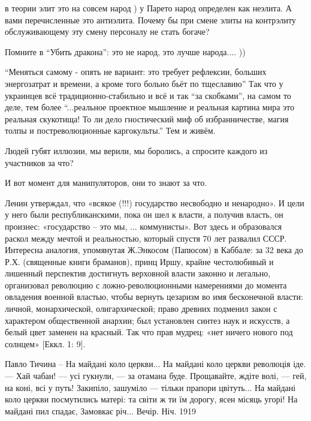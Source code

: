 \begin{itemize}
\begin{itemize}
в теории элит это на совсем народ ) у Парето народ определен как неэлита. А
вами перечисленные это антиэлита. Почему бы при смене элиты на контрэлиту
обслуживающему эту смену персоналу не стать богаче?

Помните в \enquote{Убить дракона}: это не народ, это лучше народа.... ))

\end{itemize} %


\enquote{Меняться самому - опять не вариант: это требует рефлексии, больших
энергозатрат и времени, а кроме того больно бьёт по тщеславию} Так что у
украинцев всё традиционно-стабильно и всё и так \enquote{за скобками}, на самом то
деле, тем более \enquote{...реальное проектное мышление и реальная картина мира это
реальная скукотища! То ли дело гностический миф об избранничестве, магия толпы
и постреволюционные каргокульты.} Тем и живём.


Людей губят иллюзии, мы верили, мы боролись, а спросите каждого из участников
за что?

И вот момент для манипуляторов, они то знают за что.


Ленин утверждал, что «всякое (!!!) государство несвободно и ненародно». И цели
у него были республиканскими, пока он шел к власти, а получив власть, он
произнес: «государство – это мы, ... коммунисты». Вот здесь и образовался раскол
между мечтой и реальностью, который спустя 70 лет развалил СССР. Интересна
аналогия, упомянутая Ж.Энкосом (Папюсом) в Каббале: за 32 века до Р.Х.
(священные книги браманов), принц Иршу, крайне честолюбивый и лишенный
перспектив достигнуть верховной власти законно и легально, организовал
революцию с ложно-революционными намерениями до момента овладения военной
властью, чтобы вернуть цезаризм во имя бесконечной власти: личной,
монархической, олигархической; право древних подменил закон с характером
общественной анархии; был установлен синтез наук и искусств, а белый цвет
заменен на красный. Так что прав мудрец: «нет ничего нового под солнцем» [Еккл.
1: 9].


\obeycr
Павло Тичина – На майдані коло церкви...
На майдані коло церкви
революція іде.
— Хай чабан! — усі гукнули, —
за отамана буде.
Прощавайте, ждіте волі, —
гей, на коні, всі у путь!
Закипіло, зашуміло —
тільки прапори цвітуть...
На майдані коло церкви
посмутились матері:
та світи ж ти їм дорогу,
ясен місяць угорі!
На майдані пил спадає,
Замовкає річ...
Вечір.
Ніч.
1919
\restorecr


\end{itemize}
